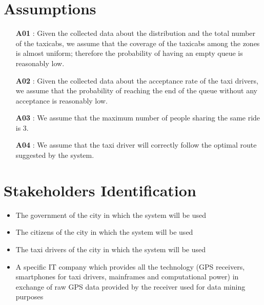 \section{Assumptions} \label{assump}
\begin{itemize}
	\item [\textbf{A01}]: Given the collected data about the distribution and the total number of the taxicabs, we assume that the coverage of the taxicabs among the zones is almost uniform; therefore the probability of having an empty queue is reasonably low.
	\item [\textbf{A02}]: Given the collected data about the acceptance rate of the taxi drivers, we assume that the probability of reaching the end of the queue without any acceptance is reasonably low.
	\item [\textbf{A03}]: We assume that the maximum number of people sharing the same ride is 3.
	\item [\textbf{A04}]: We assume that the taxi driver will correctly follow the optimal route suggested by the system.
\end{itemize}

\section{Stakeholders Identification}
\begin{itemize}
	\item The government of the city in which the system will be used
	\item The citizens of the city in which the system will be used
	\item The taxi drivers of the city in which the system will be used
	\item A specific IT company which provides all the technology (GPS receivers, smartphones for taxi drivers, mainframes and computational power) in exchange of raw GPS data provided by the receiver used for data mining purposes
\end{itemize}

